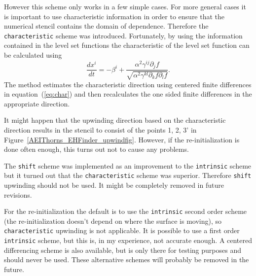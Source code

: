However this scheme only works in a few simple cases. For more general cases
it is important to use characteristic information in order to ensure that
the numerical stencil contains the domain of dependence. Therefore the
{\tt characteristic} scheme was introduced. Fortunately, by using the
information contained in the level set functions the characteristic of
the level set function can be calculated using
\begin{equation}
\frac{dx^{i}}{dt}=-\beta^{i}+\frac{\alpha^{2}\gamma^{ij}\partial_{j}f}
{\sqrt{\alpha^{2}\gamma^{kl}\partial_{k}f\partial_{l}f}}. 
\label{eq:char}
\end{equation}
The method estimates the characteristic direction using centered finite
differences in equation~(\ref{eq:char}) and then recalculates the one
sided finite differences in the appropriate direction.

It might happen that the upwinding direction based on the characteristic
direction results in the stencil to consist of the points 1, 2, 3' in 
Figure~\ref{AEIThorns_EHFinder_upwindfig}. However, if the 
re-initialization is done often enough, this turns out not to cause
any problems.

The {\tt shift} scheme was implemented as an improvement to the {\tt intrinsic}
scheme but it turned out that the {\tt characteristic} scheme was superior.
Therefore {\tt shift} upwinding should not be used. It might be completely
removed in future revisions.

For the re-initialization the default is to use the {\tt intrinsic} 
second order scheme (the re-initialization doesn't depend on where the
surface is moving), so {\tt characteristic} upwinding is not applicable.
It is possible to use a first order {\tt intrinsic} scheme, but this is, in my
experience, not accurate enough. A centered differencing scheme is also
available, but is only there for testing purposes and should never be used.
These alternative schemes will probably be removed in the future.

